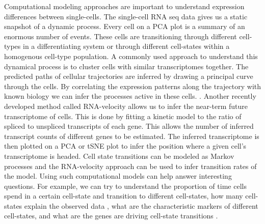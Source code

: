 Computational modeling approaches are important to understand expression differences between single-cells. The single-cell RNA seq data gives us a static snapshot of a dynamic process. Every cell on a PCA plot is a summary of an enormous number of events. These cells are transitioning through different cell-types in a differentiating system or through different cell-states within a homogenous cell-type population. A commonly used approach to understand this dynamical process is to cluster cells with similar transcriptomes together. The predicted paths of cellular trajectories are inferred by drawing a principal curve through the cells. By correlating the expression patterns along the trajectory with known biology we can infer the processes active in these cells. \cite{trapnell_dynamics_2014}. Another recently developed method called RNA-velocity allows us to infer the near-term future transcriptome of cells. This is done by fitting a kinetic model to the ratio of spliced to unspliced transcripts of each gene. This allows the number of inferred transcript counts of different genes to be estimated. The inferred transcriptome is then plotted on a PCA or tSNE plot to infer the position where a given cell's transcriptome is headed.  \cite{manno_rna_2018} Cell state transitions can be modeled as Markov processes \cite{stumpf_stem_2017} and the RNA-velocity approach can be used to infer transition rates of the model. Using such computational models can help answer interesting questions. For example, we can try to understand the proportion of time cells spend in a certain cell-state and transition to different cell-states, how many cell-states explain the observed data  \cite{chang_transcriptome-wide_2008}, what are the characteristic markers of different cell-states, and what are the genes are driving cell-state transitions \cite{furchtgott_discovering_2017}.

